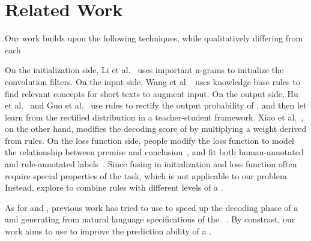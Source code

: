\section{Related Work}
Our work builds upon the following techniques, while qualitatively differing from each

On the initialization side, Li et al.~ uses important n-grams to initialize the convolution filters.
On the input side, Wang et al.~ uses knowledge base rules to find relevant concepts for short texts to augment input.
On the output side,
Hu et al.~ and Guo et al.~ use \FOL rules to rectify the output probability of \NN, and then let \NN learn from the rectified distribution in a teacher-student framework.
Xiao et al.~, on the other hand, modifies the decoding score of \NN by multiplying a weight derived from rules.
On the loss function side, people modify the loss function to model the relationship between premise and conclusion~\cite{demeester2016lifted}, and fit both human-annotated and rule-annotated labels~\cite{alashkar2017examples}.
Since fusing in initialization and loss function often require special properties of the task, which is not applicable to our problem.
Instead, explore to combine \RE rules with different levels of a \NN.

 As for \NNs and \REs, previous work has tried to use \RE to speed up the decoding phase of a
\NN~\cite{strauss2016regular} and generating \REs from natural language specifications of the \RE~\cite{locascio2016neural}. By constrast,
our work aims to use \REs to improve the prediction ability of a \NN.

